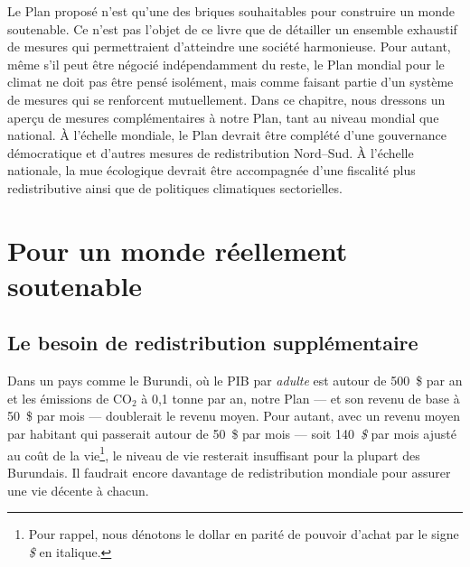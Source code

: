 \documentclass[a5paper,french,openany]{memoir}
\begin{document}
Le Plan proposé n'est qu'une des briques souhaitables pour construire un monde soutenable. Ce n'est pas l'objet de ce livre que de détailler un ensemble exhaustif de mesures qui permettraient d'atteindre une société harmonieuse. Pour autant, même s'il peut être négocié indépendamment du reste, le Plan mondial pour le climat ne doit pas être pensé isolément, mais comme faisant partie d'un système de mesures qui se renforcent mutuellement. Dans ce chapitre, nous dressons un aperçu de mesures complémentaires à notre Plan, tant au niveau mondial que national. À l'échelle mondiale, le Plan devrait être complété d'une gouvernance démocratique et d'autres mesures de redistribution Nord--Sud. À l'échelle nationale, la mue écologique devrait être accompagnée d'une fiscalité plus redistributive ainsi que de politiques climatiques sectorielles. 

\section{Pour un monde réellement soutenable}

\subsection{Le besoin de redistribution supplémentaire}
Dans un pays comme le Burundi, où le PIB par \textit{adulte} est autour de 500~\$ par an et les émissions de CO$_\text{2}$ à 0,1 tonne par an, notre Plan --- et son revenu de base à 50~\$ par mois --- doublerait le revenu moyen. 
Pour autant, avec un revenu moyen par habitant qui passerait autour de 50~\$ par mois --- soit 140~\textit{\$} par mois ajusté au coût de la vie\footnote{Pour rappel, nous dénotons le dollar en parité de pouvoir d'achat par le signe \textit{\$} en italique.}, 
le niveau de vie resterait insuffisant pour la plupart des Burundais. Il faudrait encore davantage de redistribution mondiale pour assurer une vie décente à chacun. 
\end{document}
